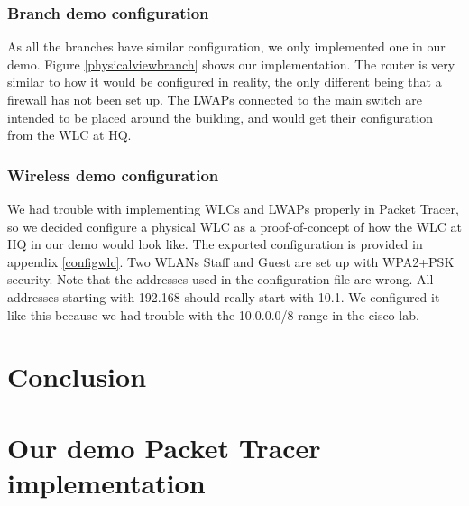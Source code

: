 \subsubsection{Branch demo configuration}

As all the branches have similar configuration, we only implemented one in our demo. Figure \ref{physicalviewbranch} shows our implementation. %
The router is very similar to how it would be configured in reality, the only different being that a firewall has not been set up. The LWAPs connected to the main switch are intended to be placed around the building, and would get their configuration from the WLC at HQ.

\subsubsection{Wireless demo configuration} \label{demowireless}

We had trouble with implementing WLCs and LWAPs properly in Packet Tracer, so we decided configure a physical WLC as a proof-of-concept of how the WLC at HQ in our demo would look like. The exported configuration is provided in appendix \ref{configwlc}. Two WLANs Staff and Guest are set up with WPA2+PSK security. Note that the addresses used in the configuration file are wrong. All addresses starting with 192.168 should really start with 10.1. We configured it like this because we had trouble with the 10.0.0.0/8 range in the cisco lab.

\section{Conclusion}



\clearpage %

\nocite{*}





\clearpage %
\appendix

\section{Our demo Packet Tracer implementation} \label{config}

